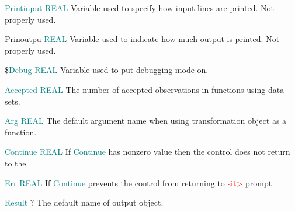 {\noindent \textcolor{teal}{Printinput} \tabto{25mm }   \textcolor{teal}{REAL} \tabto{45mm }   Variable used to specify how input lines are printed. Not properly used. 
 
\noindent Prinoutpu \tabto{25mm }   \textcolor{teal}{REAL} \tabto{45mm }   Variable used to indicate how much output is printed. Not properly used. 
 
 
 
 
 
 
\noindent \$\textcolor{teal}{Debug} \tabto{25mm }  \textcolor{teal}{REAL} \tabto{45mm }   Variable used to put debugging mode on. 
 
 
 
 
 
 
 
 
 
\noindent \textcolor{teal}{Accepted}  \tabto{25mm }  \textcolor{teal}{REAL} \tabto{45mm }   The number of accepted observations in functions using data sets. 
 
 
\noindent \textcolor{teal}{Arg} \tabto{25mm }   \textcolor{teal}{REAL}  \tabto{45mm }   The default argument name when using transformation object as a function. 
 
 
 
\noindent \textcolor{teal}{Continue}  \tabto{25mm }  \textcolor{teal}{REAL} \tabto{45mm }   If \textcolor{teal}{Continue} has nonzero value then the control does not return to the 
 
 
 
\noindent \textcolor{teal}{Err} \tabto{25mm }  \textcolor{teal}{REAL} \tabto{45mm }   If \textcolor{teal}{Continue} prevents the control from returning to \textcolor{Red}{sit>} prompt 
 
 
 
 
 
 
 
\noindent \textcolor{teal}{Result} \tabto{25mm }   ?  \tabto{45mm }   The default name of output object. 
 
}
